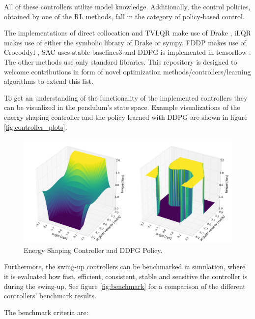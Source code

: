 \documentclass[onecolumn, letter paper]{report}
\begin{document}
All of these controllers utilize model knowledge. Additionally, the control policies, obtained by one of the RL methods, fall in the category of policy-based control.

The implementations of direct collocation and TVLQR make use of Drake \autocite{drake}, iLQR makes use of either the symbolic library of Drake or sympy, FDDP makes use of Crocoddyl \autocite{mastalli2020crocoddyl}, SAC uses stable-baselines3 \autocite{stable-baselines3} and DDPG is implemented in tensorflow \autocite{tensorflow2015-whitepaper}. The other methods use only standard libraries.
This repository is designed to welcome contributions in form of novel optimization methods/controllers/learning algorithms to extend this list.

To get an understanding of the functionality of the implemented controllers they can be visualized in the pendulum's state space. Example visualizations of the energy shaping controller and the policy learned with DDPG are shown in figure \autoref{fig:controller_plots}.

\begin{figure}[H]
    \centering
    \includegraphics[width=0.6\linewidth]{figures/energy_and_ddpg.png}
    \caption{Energy Shaping Controller and DDPG Policy.}
    \label{fig:controller_plots}
\end{figure}

Furthermore, the swing-up controllers can be benchmarked in simulation, where it is evaluated how fast, efficient, consistent, stable and sensitive the controller is during the swing-up. See figure \autoref{fig:benchmark} for a comparison of the different controllers' benchmark results.

The benchmark criteria are:
\end{document}
